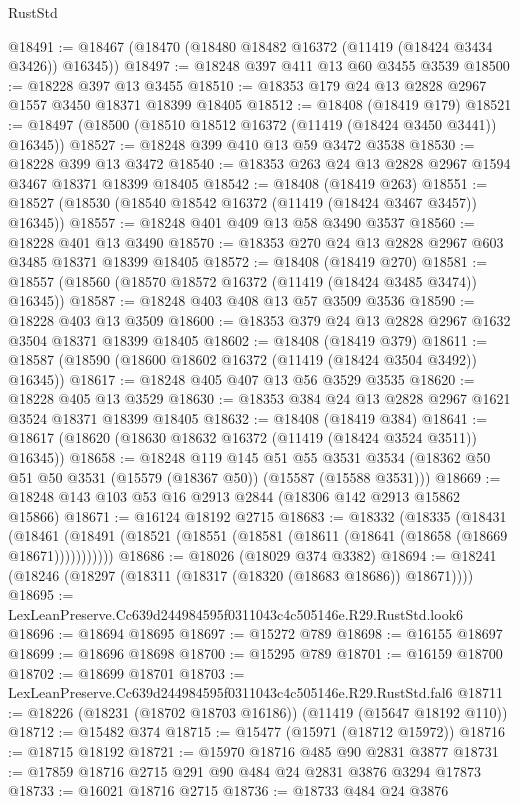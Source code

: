 \begin{lexlean}{RustStd}
\begin{coremodule}
@18491 := @18467 (@18470 (@18480 @18482 @16372 (@11419 (@18424 @3434 @3426)) @16345))
@18497 := @18248 @397 @411 @13 @60 @3455 @3539
@18500 := @18228 @397 @13 @3455
@18510 := @18353 @179 @24 @13 @2828 @2967 @1557 @3450 @18371 @18399 @18405
@18512 := @18408 (@18419 @179)
@18521 := @18497 (@18500 (@18510 @18512 @16372 (@11419 (@18424 @3450 @3441)) @16345))
@18527 := @18248 @399 @410 @13 @59 @3472 @3538
@18530 := @18228 @399 @13 @3472
@18540 := @18353 @263 @24 @13 @2828 @2967 @1594 @3467 @18371 @18399 @18405
@18542 := @18408 (@18419 @263)
@18551 := @18527 (@18530 (@18540 @18542 @16372 (@11419 (@18424 @3467 @3457)) @16345))
@18557 := @18248 @401 @409 @13 @58 @3490 @3537
@18560 := @18228 @401 @13 @3490
@18570 := @18353 @270 @24 @13 @2828 @2967 @603 @3485 @18371 @18399 @18405
@18572 := @18408 (@18419 @270)
@18581 := @18557 (@18560 (@18570 @18572 @16372 (@11419 (@18424 @3485 @3474)) @16345))
@18587 := @18248 @403 @408 @13 @57 @3509 @3536
@18590 := @18228 @403 @13 @3509
@18600 := @18353 @379 @24 @13 @2828 @2967 @1632 @3504 @18371 @18399 @18405
@18602 := @18408 (@18419 @379)
@18611 := @18587 (@18590 (@18600 @18602 @16372 (@11419 (@18424 @3504 @3492)) @16345))
@18617 := @18248 @405 @407 @13 @56 @3529 @3535
@18620 := @18228 @405 @13 @3529
@18630 := @18353 @384 @24 @13 @2828 @2967 @1621 @3524 @18371 @18399 @18405
@18632 := @18408 (@18419 @384)
@18641 := @18617 (@18620 (@18630 @18632 @16372 (@11419 (@18424 @3524 @3511)) @16345))
@18658 := @18248
    @119
    @145
    @51
    @55
    @3531
    @3534
    (@18362 @50 @51 @50 @3531 (@15579 (@18367 @50)) (@15587 (@15588 @3531)))
@18669 := @18248 @143 @103 @53 @16 @2913 @2844 (@18306 @142 @2913 @15862 @15866)
@18671 := @16124 @18192 @2715
@18683 := @18332
    (@18335
      (@18431
        (@18461 (@18491 (@18521 (@18551 (@18581 (@18611 (@18641 (@18658 (@18669 @18671)))))))))))
@18686 := @18026 (@18029 @374 @3382)
@18694 := @18241 (@18246 (@18297 (@18311 (@18317 (@18320 (@18683 @18686)) @18671))))
@18695 := LexLeanPreserve.Cc639d244984595f0311043c4c505146e.R29.RustStd.look6
@18696 := @18694 @18695
@18697 := @15272 @789
@18698 := @16155 @18697
@18699 := @18696 @18698
@18700 := @15295 @789
@18701 := @16159 @18700
@18702 := @18699 @18701
@18703 := LexLeanPreserve.Cc639d244984595f0311043c4c505146e.R29.RustStd.fal6
@18711 := @18226 (@18231 (@18702 @18703 @16186)) (@11419 (@15647 @18192 @110))
@18712 := @15482 @374
@18715 := @15477 (@15971 (@18712 @15972))
@18716 := @18715 @18192
@18721 := @15970 @18716 @485 @90 @2831 @3877
@18731 := @17859 @18716 @2715 @291 @90 @484 @24 @2831 @3876 @3294 @17873
@18733 := @16021 @18716 @2715
@18736 := @18733 @484 @24 @3876

\end{coremodule}
\end{lexlean}
